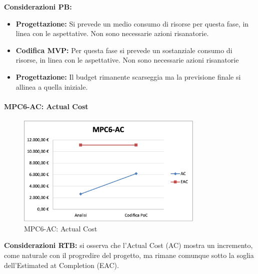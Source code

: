 \newpage

\noindent \textbf{Considerazioni PB:} 
\begin{itemize}
    \item \textbf{Progettazione:} Si prevede un medio consumo di risorse per questa fase, in linea con le aspettative. Non sono necessarie azioni risanatorie.
    \item \textbf{Codifica MVP:} Per questa fase si prevede un sostanziale consumo di risorse, in linea con le aspettative. Non sono necessarie azioni risanatorie
    \item \textbf{Progettazione:} Il budget rimanente scarseggia ma la previsione finale si allinea a quella iniziale. 
\end{itemize}

\paragraph{MPC6-AC: Actual Cost}
\begin{figure}[h!] 
    \centering
    \includegraphics[width=0.8\textwidth]{images/MPC6-AC.png}
    \caption{MPC6-AC: Actual Cost}
\end{figure}
\noindent \textbf{Considerazioni RTB:} si osserva che l’Actual Cost (AC) mostra un incremento, come naturale con il progredire del progetto, ma rimane comunque sotto la soglia dell'Estimated at Completion (EAC). 

